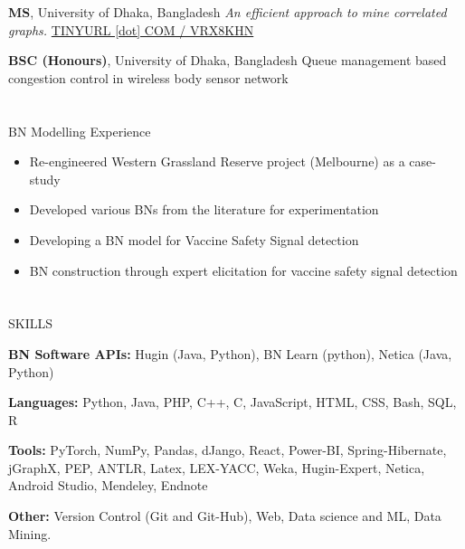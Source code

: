 \documentclass{my_cv}
\begin{document}
{\textbf{MS}, University of Dhaka, Bangladesh} %
{{\em An efficient approach to mine correlated graphs.} \href{https://tinyurl.com/vrx8khn}{TINYURL [dot] COM / VRX8KHN}}

{\textbf{BSC (Honours)}, University of Dhaka, Bangladesh} %
{Queue management based congestion control in wireless body sensor network}

\section{\faBuilding}{BN Modelling Experience}

\begin{itemize}[noitemsep]
    \item Re-engineered Western Grassland Reserve project (Melbourne) as a case-study
    \item Developed various BNs from the literature for experimentation
    \item Developing a BN model for Vaccine Safety Signal detection
    \item BN construction through expert elicitation for vaccine safety signal detection
\end{itemize}

\section{\faList}{SKILLS}

\textbf{BN Software APIs:} Hugin (Java, Python), BN Learn (python), Netica (Java, Python)

\noindent\textbf{Languages:} Python, Java, PHP, C++, C, JavaScript, HTML, CSS, Bash, SQL, R

\noindent\textbf{Tools:} PyTorch, NumPy, Pandas, dJango, React, Power-BI, Spring-Hibernate, jGraphX, PEP, ANTLR, Latex, LEX-YACC, Weka, Hugin-Expert, Netica, Android Studio, Mendeley, Endnote

\noindent\textbf{Other:} Version Control (Git and Git-Hub), Web, Data science and ML, Data Mining.
\end{document}
